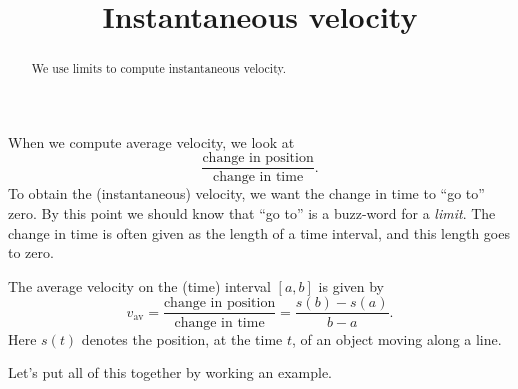 \documentclass{ximera}
\title[Dig-In:]{Instantaneous velocity}
\begin{document}
\begin{abstract}
We use limits to compute instantaneous velocity.
\end{abstract}
\maketitle

When we compute average velocity, we look at 
\[
\frac{\text{change in position}}{\text{change in time}}.
\]
To obtain the (instantaneous) velocity, we want the change in time to
``go to'' zero. By this point we should know that ``go to'' is a
buzz-word for a \emph{limit}. The change in time is often given as
the length of a time interval, and this length goes to zero.

The average velocity on the (time) interval $[a,b]$ is given by
\[
v_{\text{av}} = 
\frac{\text{change in position}}{\text{change in time}} =
\frac{s(b)-s(a)}{b-a}.
\]
Here $s(t)$ denotes the position, at the time $t$, of an object moving along a line.

Let's put all of this together by working an example.
\end{document}

